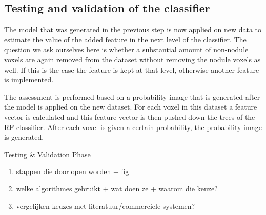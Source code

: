 \subsection{Testing and validation of the classifier}
The model that was generated in the previous step is now applied on new data
to estimate the value of the added feature in the next level of the
classifier.
The question we ask ourselves here is whether a substantial amount of
non-nodule voxels are again removed from the dataset without removing the nodule
voxels as well. If this is the case the feature is kept at that level, otherwise
another feature is implemented.

The assessment is performed based on a probability image that is generated after
the model is applied on the new dataset. For each voxel in this dataset a
feature vector is calculated and this feature vector is then pushed down the
trees of the RF classifier. After each voxel is given a certain probability, the
probability image is generated.

\begin{algorithm}[H]
	\DontPrintSemicolon
	\caption{Testing \& Validation Phase\label{alg:test}}
\end{algorithm}

\begin{enumerate}
\item stappen die doorlopen worden + fig
\item welke algorithmes gebruikt + wat doen ze + waarom die keuze?
\item vergelijken keuzes met literatuur/commerciele systemen?
\end{enumerate}